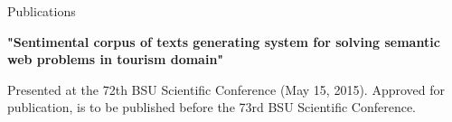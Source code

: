 \documentclass{resume} %
\begin{document}
\begin{rSection}{Publications}

{\bf "Sentimental corpus of texts generating system for solving semantic web problems in tourism domain"}

Presented at the 72th BSU Scientific Conference (May 15, 2015). Approved for publication, is to be published before the 73rd BSU Scientific Conference.

\end{rSection}






\end{document}
